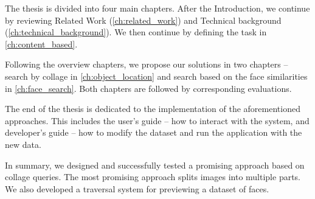 The thesis is divided into four main chapters. After the Introduction, we continue by reviewing Related Work (\autoref{ch:related_work}) and Technical background (\autoref{ch:technical_background}). We then continue by defining the task in \autoref{ch:content_based}.

Following the overview chapters, we propose our solutions in two chapters -- search by collage in \autoref{ch:object_location} and search based on the face similarities in \autoref{ch:face_search}. Both chapters are followed by corresponding evaluations.

The end of the thesis is dedicated to the implementation of the aforementioned approaches. This includes the user's guide -- how to interact with the system, and developer's guide -- how to modify the dataset and run the application with the new data.

\bigskip

In summary, we designed and successfully tested a promising approach based on collage queries. The most promising approach splits images into multiple parts. We also developed a traversal system for previewing a dataset of faces.